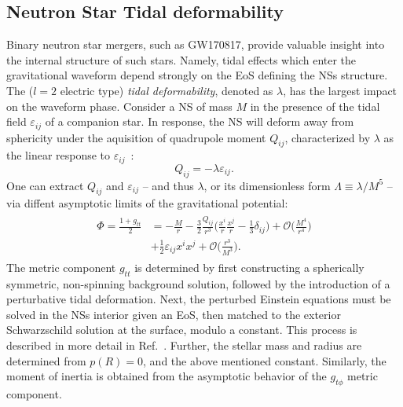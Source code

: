\documentclass[prd,twocolumn,nofootinbib,superscriptaddress,amsmath,amssymb]{revtex4-1}
\begin{document}
\subsection{Neutron Star Tidal deformability}\label{tidal}
Binary neutron star mergers, such as GW170817, provide valuable insight into the internal structure of such stars. 
Namely, tidal effects which enter the gravitational waveform depend strongly on the EoS defining the NSs structure. 
The ($l=2$ electric type) \emph{tidal deformability}, denoted as $\lambda$, has the largest impact on the waveform phase. 
Consider a NS of mass $M$ in the presence of the tidal field $\varepsilon_{ij}$ of a companion star.
In response, the NS will deform away from sphericity under the aquisition of quadrupole moment $Q_{ij}$, characterized by $\lambda$ as the linear response to $\varepsilon_{ij}$~\cite{Flanagan2008,hinderer-love,Yagi2013}:
\begin{equation}
Q_{ij}=-\lambda \varepsilon_{ij}.
\end{equation}
One can extract $Q_{ij}$ and $\varepsilon_{ij}$ -- and thus $\lambda$, or its dimensionless form $\Lambda \equiv \lambda/M^5$ -- via diffent asymptotic limits of the gravitational potential:
\begin{align}
\begin{split}
\Phi=\frac{1+g_{tt}}{2}&=-\frac{M}{r} - \frac{3}{2}\frac{Q_{ij}}{r^3} \Bigg(\frac{x^i}{r} \frac{x^j}{r}-\frac{1}{3}\delta_{ij} \Bigg) + \mathcal{O} \Bigg( \frac{M^4}{r^4} \Bigg)\\
&+ \frac{1}{2} \varepsilon_{ij} x^i x^j + \mathcal{O} \Bigg( \frac{r^3}{M^3} \Bigg).
\end{split}
\end{align}
The metric component $g_{tt}$ is determined by first constructing a spherically symmetric, non-spinning background solution, followed by the introduction of a perturbative tidal deformation.
Next, the perturbed Einstein equations must be solved in the NSs interior given an EoS, then matched to the exterior Schwarzschild solution at the surface, modulo a constant.
This process is described in more detail in Ref.~\cite{hinderer-love}.
Further, the stellar mass and radius are determined from $p(R)=0$, and the above mentioned constant.
Similarly, the moment of inertia is obtained from the asymptotic behavior of the $g_{t \phi}$ metric component.
\end{document}

